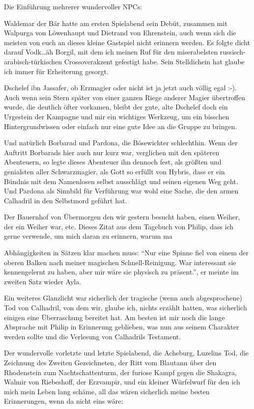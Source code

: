 Die Einführung mehrerer wundervoller NPCs:

Waldemar der Bär hatte am ersten Spielabend sein Debüt, zusammen mit Walpurga von Löwenhaupt und Dietrand von Ehrenstein, auch wenn sich die meisten von euch an dieses kleine Gastspiel nicht erinnern werden. Es folgte dicht darauf Vodk\dots äh Borgil, mit dem ich meinen Ruf für den miserabelsten russisch-arabisch-türkischen Crossoverakzent gefestigt habe. Sein Stelldichein hat glaube ich immer für Erheiterung gesorgt.

Dschelef ibn Jassafer, ob Erzmagier oder nicht ist ja jetzt auch völlig egal :-). Auch wenn sein Stern später von einer ganzen Riege anderer Magier übertroffen wurde, die deutlich öfter vorkamen, bleibt der gute, alte Dschelef doch ein Urgestein der Kampagne und mir ein wichtiges Werkzeug, um ein bisschen Hintergrundwissen oder einfach nur eine gute Idee an die Gruppe zu bringen.

Und natürlich Borbarad und Pardona, die Bösewichter schlechthin. Wenn der Auftritt Borbarads hier auch nur kurz war, verglichen mit den späteren Abenteuern, so legte dieses Abenteuer ihn dennoch fest, als größten und genialsten aller Schwarzmagier, als Gott so erfüllt von Hybris, dass er ein Bündnis mit dem Namenlosen selbst ausschlägt und seinen eigenen Weg geht. Und Pardona als Sinnbild für Verführung war wohl eine Sache, die den armen Calhadril in den Selbstmord geführt hat.

Der Bauernhof von Übermorgen den wir gestern besucht haben, einen Weiher, der ein Weiher war, etc.
Dieses Zitat aus dem Tagebuch von Philip, dass ich gerne verwende, um mich daran zu erinnern, warum ma\par Abhängigkeiten in Sätzen klar machen muss: ``Nur eine Spinne fiel von einem der oberen Balken nach meiner magischen Schnell-Reinigung. War interessant sie kennengelernt zu haben, aber mir wäre sie physisch zu präsent.'', er meinte im zweiten Satz wieder Ayla.

Ein weiteres Glanzlicht war sicherlich der tragische (wenn auch abgesprochene) Tod von Calhadril, von dem wir, glaube ich, nichts erzählt hatten, was sicherlich einigen eine Überraschung bereitet hat. Am besten ist mir noch die lange Absprache mit Philip in Erinnerung geblieben, was nun aus seinem Charakter werden sollte und die Verlesung von Calhadrils Testament.

Der wundervolle vorletzte und letzte Spielabend, die Acheburg, Luzelins Tod, die Zeichnung des Zweiten Gezeichneten, der Ritt vom Blautann über den Rhodenstein zum Nachtschattenturm, der furiose Kampf gegen die Shakagra, Walmir von Riebeshoff, der Erzvampir, und ein kleiner Würfelwurf für den ich mich mein Leben lang schäme, all das wären sicherlich meine besten Erinnerungen, wenn da nicht eins wäre:\par\bigskip

